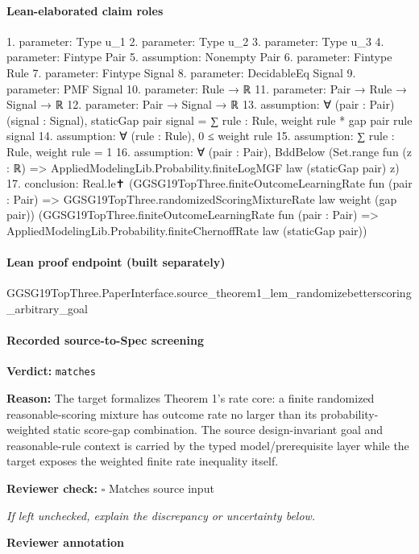 \documentclass[10pt]{article}
\newcommand{\reviewerbox}{%
  \par\noindent\fbox{\parbox{0.96\linewidth}{\rule{0pt}{0.38in}}}\par
}
\newcommand{\reviewmatch}[1]{%
  \par\noindent\textbf{Reviewer check:} $\square$\; #1\par
  \noindent\emph{If left unchecked, explain the discrepancy or uncertainty below.}\par
}
\begin{document}
\paragraph{Lean-elaborated claim roles}\begin{ReviewVerbatim}
1. parameter: Type u_1
2. parameter: Type u_2
3. parameter: Type u_3
4. parameter: Fintype Pair
5. assumption: Nonempty Pair
6. parameter: Fintype Rule
7. parameter: Fintype Signal
8. parameter: DecidableEq Signal
9. parameter: PMF Signal
10. parameter: Rule → ℝ
11. parameter: Pair → Rule → Signal → ℝ
12. parameter: Pair → Signal → ℝ
13. assumption: ∀ (pair : Pair) (signal : Signal), staticGap pair signal = ∑ rule : Rule, weight rule * gap pair rule signal
14. assumption: ∀ (rule : Rule), 0 ≤ weight rule
15. assumption: ∑ rule : Rule, weight rule = 1
16. assumption: ∀ (pair : Pair), BddBelow (Set.range fun (z : ℝ) => AppliedModelingLib.Probability.finiteLogMGF law (staticGap pair) z)
17. conclusion: Real.le✝
  (GGSG19TopThree.finiteOutcomeLearningRate fun (pair : Pair) =>
    GGSG19TopThree.randomizedScoringMixtureRate law weight (gap pair))
  (GGSG19TopThree.finiteOutcomeLearningRate fun (pair : Pair) =>
    AppliedModelingLib.Probability.finiteChernoffRate law (staticGap pair))
\end{ReviewVerbatim}

\paragraph{Lean proof endpoint (built separately)}\begin{ReviewVerbatim}
GGSG19TopThree.PaperInterface.source_theorem1_lem_randomizebetterscoring_arbitrary_goal
\end{ReviewVerbatim}

\paragraph{Recorded source-to-Spec screening}
\textbf{Verdict:} \texttt{matches}
\\
{\raggedright
\textbf{Reason:} The target formalizes Theorem 1's rate core:\allowbreak{} a finite randomized reasonable-\allowbreak{}scoring mixture has outcome rate no larger than its probability-\allowbreak{}weighted static score-\allowbreak{}gap combination.\allowbreak{} The source design-\allowbreak{}invariant goal and reasonable-\allowbreak{}rule context is carried by the typed model/\allowbreak{}prerequisite layer while the target exposes the weighted finite rate inequality itself.\allowbreak{}
\par}
\reviewmatch{Matches source input}
\noindent\textbf{Reviewer annotation}\par
\reviewerbox
\clearpage
\hypertarget{source-claim-82eaa4a544e4300f}{}
\end{document}
